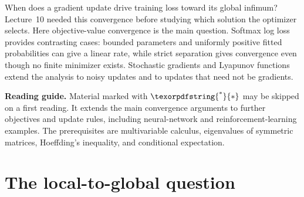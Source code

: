 \documentclass[11pt,twoside]{article}
\newcommand{\suppmark}{\texorpdfstring{\textsuperscript{*}}{*}}
\theoremstyle{definition}
\theoremstyle{remark}
\begin{document}
\begin{center}
\end{center}

When does a gradient update drive training loss toward its global infimum?
Lecture~10 needed this convergence before studying which solution the
optimizer selects. Here objective-value convergence is the main question.
Softmax log loss provides contrasting cases: bounded parameters and uniformly
positive fitted probabilities can give a linear rate, while strict
separation gives convergence even though no finite minimizer exists.
Stochastic gradients and Lyapunov functions extend the analysis to noisy
updates and to updates that need not be gradients.

\noindent\textbf{Reading guide.}
Material marked with $\suppmark$ may be skipped on a first reading. It
extends the main convergence arguments to further objectives and update
rules, including neural-network and reinforcement-learning examples.
The prerequisites are multivariable calculus, eigenvalues of symmetric
matrices, Hoeffding's inequality, and conditional expectation.

\section{The local-to-global question}
\label{sec:local-global-question}
\end{document}
